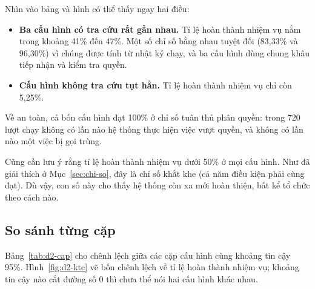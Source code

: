 
Nhìn vào bảng và hình có thể thấy ngay hai điều:

\begin{itemize}
    \item \textbf{Ba cấu hình có tra cứu rất gần nhau.} Tỉ lệ hoàn thành nhiệm vụ nằm trong khoảng 41\% đến 47\%. Một số chỉ số bằng nhau tuyệt đối (83,33\% và 96,30\%) vì chúng được tính từ nhật ký chạy, và ba cấu hình dùng chung khâu tiếp nhận và kiểm tra quyền.
    \item \textbf{Cấu hình không tra cứu tụt hẳn.} Tỉ lệ hoàn thành nhiệm vụ chỉ còn 5,25\%.
\end{itemize}

Về an toàn, cả bốn cấu hình đạt 100\% ở chỉ số tuân thủ phân quyền: trong 720 lượt chạy không có lần nào hệ thống thực hiện việc vượt quyền, và không có lần nào một việc bị gọi trùng.

Cũng cần lưu ý rằng tỉ lệ hoàn thành nhiệm vụ dưới 50\% ở mọi cấu hình. Như đã giải thích ở Mục~\ref{sec:chi-so}, đây là chỉ số khắt khe (cả năm điều kiện phải cùng đạt). Dù vậy, con số này cho thấy hệ thống còn xa mới hoàn thiện, bất kể tổ chức theo cách nào.

\subsection{So sánh từng cặp}

Bảng~\ref{tab:d2-cap} cho chênh lệch giữa các cặp cấu hình cùng khoảng tin cậy 95\%. Hình~\ref{fig:d2-ktc} vẽ bốn chênh lệch về tỉ lệ hoàn thành nhiệm vụ; khoảng tin cậy nào cắt đường số 0 thì chưa thể nói hai cấu hình khác nhau.

